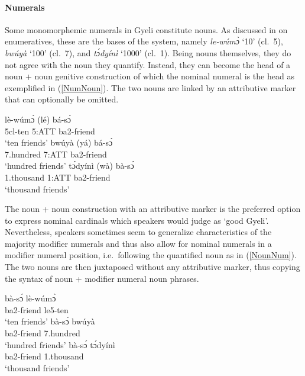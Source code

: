 \paragraph{Numerals} Some monomorphemic numerals in Gyeli constitute nouns. As discussed in  on enumeratives, these are the bases of the system, namely {\itshape le-wúmɔ̀} `10' (cl.~5), {\itshape bwúyà} `100' (cl.~7), and {\itshape tɔ́dyínì} `1000' (cl.~1). Being nouns themselves, they do not agree with the noun they quantify. Instead, they can become the head of a noun + noun genitive construction of which the nominal numeral is the head as exemplified in (\ref{NumNoun}). The two nouns are linked by an attributive marker that can optionally be omitted.

\begin{exe}
\ex\label{NumNoun}
\begin{xlist}
\ex \label{NumNoun1}
  \gll     lè-wúmɔ̀ (lé) bá-sɔ́\\
                5cl-ten 5:ATT ba2-friend \\
    \trans `ten friends'
\ex\label{NumNoun2}
 \gll     bwúyà (yá) bá-sɔ́ \\
                7.hundred 7:ATT ba2-friend \\
    \trans `hundred friends'
\ex\label{NumNoun3}
 \gll     tɔ́dyínì (wà) bà-sɔ́ \\
                1.thousand 1:ATT ba2-friend \\
    \trans `thousand friends'
\end {xlist}
\end {exe}

\noindent The noun + noun construction with an attributive marker is the preferred option to express nominal cardinals which speakers would judge as `good Gyeli'. Nevertheless, speakers sometimes seem to generalize characteristics of the majority modifier numerals and thus also allow for nominal numerals in a modifier numeral position, i.e.~following the quantified noun as in (\ref{NounNum}). The two nouns are then juxtaposed without any attributive marker, thus copying the syntax of noun + modifier numeral noun phrases.

\begin{exe}
\ex\label{NounNum}
\begin{xlist}
\ex \label{NounNum1}
  \gll     bà-sɔ́ lè-wúmɔ̀\\
                ba2-friend le5-ten \\
    \trans `ten friends'
\ex\label{NounNum2}
 \gll     bà-sɔ́ bwúyà \\
                ba2-friend 7.hundred \\
    \trans `hundred friends'
\ex\label{NounNum3}
 \gll     bà-sɔ́ tɔ́dyínì \\
                ba2-friend 1.thousand \\
    \trans `thousand friends'
\end {xlist}
\end {exe}





